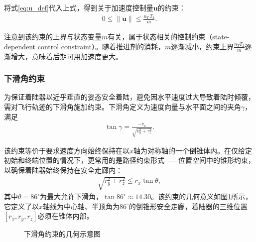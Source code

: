 将式\eqref{eq:u_def}代入上式，得到关于加速度控制量$\bm{u}$的约束：
\begin{align}
    0 \leq \|\bm{u}\| \leq \frac{n_T\,T_2}{m}. \label{eq:u_bound}
\end{align}

注意到该约束的上界与状态变量$m$有关，属于状态相关的控制约束（state-dependent control constraint）。随着推进剂的消耗，$m$逐渐减小，约束上界$\frac{n_T T_2}{m}$逐渐增大，意味着后期可用加速度更大。

\subsubsection{下滑角约束}

为保证着陆器以近乎垂直的姿态安全着陆，避免因水平速度过大导致着陆时倾覆，需对飞行轨迹的下滑角施加约束。下滑角定义为速度向量与水平面之间的夹角$\gamma$，满足
\begin{align}
    \tan\gamma = \frac{-v_x}{\sqrt{v_y^2 + v_z^2}}.
\end{align}

该约束等价于要求速度方向始终保持在以$x$轴为对称轴的一个倒锥体内。在仅给定初始和终端位置的情况下，更常用的是路径约束形式——位置空间中的锥形约束，以确保着陆器始终保持在安全走廊内：
\begin{align}
    \sqrt{r_y^2 + r_z^2} \leq r_x \tan\theta, \label{eq:glideslope}
\end{align}
其中$\theta = 86^\circ$为最大允许下滑角，$\tan 86^\circ \approx 14.30$。该约束的几何意义如图\ref{fig:glideslope}所示，它定义了以$x$轴线为中心轴、半顶角为$86^\circ$的倒锥形安全走廊，着陆器的三维位置$[r_x, r_y, r_z]$必须在锥体内部。

\begin{figure}[tbp]
    \centering
    \caption{下滑角约束的几何示意图}
    \label{fig:glideslope}
\end{figure}

